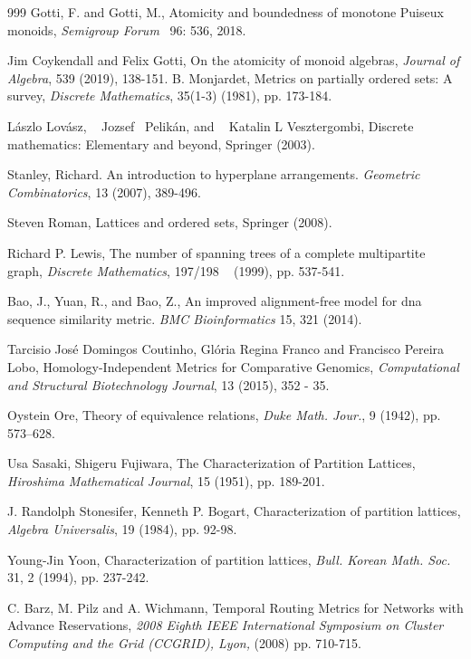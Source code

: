 \documentclass[12pt]{extarticle}
\begin{document}
\begin{thebibliography}{999}
 Gotti, F. and Gotti, M., Atomicity and boundedness of monotone Puiseux monoids, \textit{Semigroup Forum}  96: 536, 2018.

 Jim Coykendall and Felix Gotti, On the atomicity of monoid algebras,	\textit{Journal of Algebra},
539 (2019),
138-151.
 B. Monjardet,
Metrics on partially ordered sets: A survey, \textit{Discrete Mathematics},
35(1-3) (1981), pp. 173-184.

 L\'aszlo Lov\'asz,   Jozsef  Pelik\'an, and   Katalin L Vesztergombi, Discrete mathematics: Elementary and beyond, 
Springer
(2003).

 Stanley, Richard. An introduction to hyperplane arrangements. \textit{Geometric Combinatorics}, 13 (2007), 389-496.

 Steven Roman, Lattices and ordered sets, Springer
(2008).

 Richard P. Lewis,
The number of spanning trees of a complete multipartite graph, \textit{Discrete Mathematics},
197/198   (1999), pp. 537-541.

 Bao, J., Yuan, R., and Bao, Z., An improved alignment-free model for dna sequence similarity metric. \textit{BMC Bioinformatics} 15, 321 (2014).

 Tarcisio Jos\'{e} Domingos Coutinho, Gl\'{o}ria Regina Franco and Francisco Pereira Lobo,
Homology-Independent Metrics for Comparative Genomics,
\textit{Computational and Structural Biotechnology Journal},
13 (2015), 352 - 35.

 Oystein Ore, Theory of equivalence relations, \emph{Duke Math. Jour.}, 9 (1942), pp. 573–628.

 Usa Sasaki, Shigeru Fujiwara, The Characterization of Partition Lattices, \emph{Hiroshima Mathematical Journal}, 15 (1951), pp. 189-201.

 J. Randolph Stonesifer, Kenneth P. Bogart, Characterization of partition lattices, \emph{Algebra Universalis}, 19 (1984), pp. 92-98.

 Young-Jin Yoon, Characterization of partition lattices, \emph{Bull. Korean Math. Soc.} 31, 2 (1994), pp. 237-242.

 C. Barz, M. Pilz and A. Wichmann, Temporal Routing Metrics for Networks with Advance Reservations, \textit{ 2008 Eighth IEEE International Symposium on Cluster Computing and the Grid (CCGRID), Lyon,} (2008) pp. 710-715.


\end{thebibliography}
\end{document}
